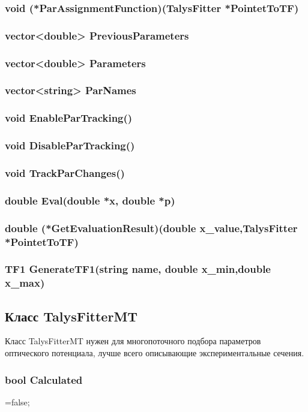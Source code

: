 \documentclass[a4paper,12pt]{extarticle}
\begin{document}
\subsubsection{void (*ParAssignmentFunction)(TalysFitter *PointetToTF)}
\subsubsection{vector<double> PreviousParameters}
\subsubsection{vector<double> Parameters}
\subsubsection{vector<string> ParNames}
\subsubsection{void EnableParTracking()}
\subsubsection{void DisableParTracking()}
\subsubsection{void TrackParChanges()}
\subsubsection{double Eval(double *x, double *p)}
\subsubsection{double (*GetEvaluationResult)(double x_value,TalysFitter *PointetToTF)}
\subsubsection{TF1 GenerateTF1(string name, double x_min,double x_max)}

\subsection{Класс TalysFitterMT}
Класс TalysFitterMT нужен для многопоточного подбора параметров оптического потенциала, лучше всего описывающие экспериментальные сечения. 

\subsubsection{bool Calculated}
=false;
\end{document}
